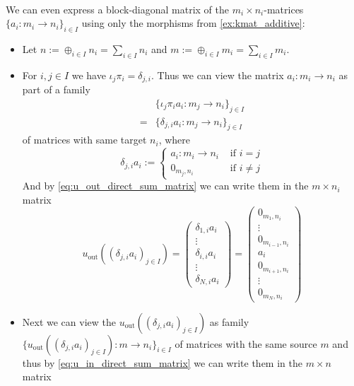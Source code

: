 \begin{example}\phantom{}\label{ex:block_diagonal_matrix}\\
We can even express a block-diagonal matrix of the $m_{i}\times n_{i}$-matrices $\{a_{i} : m_{i} \rightarrow n_{i} \}_{i\in I}$ using only
the morphisms from \ref{ex:kmat_additive}:
\begin{itemize}
\item Let $n := \oplus_{i \in I} n_{i} = \sum_{i \in I} n_{i}$ and $m := \oplus_{i \in I} m_{i} = \sum_{i \in I} m_{i}$.
\item For $i,j \in I$ we have $\iota_{j} \pi_{i} = \delta_{j,i}$. Thus we can view the matrix $a_{i} : m_{i} \rightarrow n_{i}$ as part of a family 
\begin{align}
&\{ \iota_{j} \pi_{i} a_{i} : m_{j} \rightarrow n_{i} \}_{j \in I} \\
= &\{ \delta_{j,i} a_{i} : m_{j} \rightarrow n_{i} \}_{j\in I}
\end{align}
of matrices with same
target $n_{i}$, where
\[
\delta_{j,i} a_{i} := \begin{cases}
a_{i} : m_{i} \rightarrow n_{i} & \text{ if } i = j \\
0_{m_{j},n_{i}} & \text{ if } i \neq j
\end{cases}
\]
And by \eqref{eq:u_out_direct_sum_matrix} we can write them in the $m \times n_{i}$ matrix 
\[
u_{\text{out}}((\delta_{j,i}a_{i})_{j \in I}) = \begin{pmatrix}
\delta_{1,i} a_{i} \\
\vdots \\
\delta_{i,i} a_{i} \\
\vdots \\
\delta_{N,i} a_{i}
\end{pmatrix} = \begin{pmatrix}
0_{m_{1},n_{i}} \\
\vdots \\
0_{m_{i-1},n_{i}} \\
a_{i} \\
0_{m_{i+1},n_{i}} \\
\vdots \\
0_{m_{N},n_{i}}
\end{pmatrix}
\]
\item Next we can view the $u_{\text{out}}((\delta_{j,i}a_{i})_{j \in I})$ as family
$\{u_{\text{out}}((\delta_{j,i}a_{i})_{j \in I}) : m \rightarrow n_{i}\}_{i\in I}$ of matrices
with the same source $m$ and thus by \eqref{eq:u_in_direct_sum_matrix} we can write them in the $m \times n$ matrix

\end{itemize}
\end{example}
